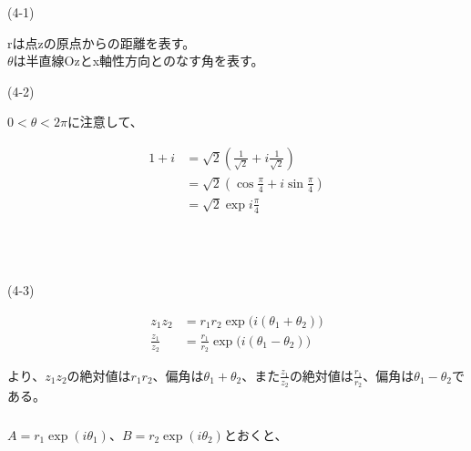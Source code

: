 \documentclass[dvipdfmx,a4paper]{jsarticle}
\begin{document}
\subsubsection{}

\begin{flushleft}
(4-1)
\end{flushleft}
rは点zの原点からの距離を表す。\\
$\theta$は半直線Ozとx軸性方向とのなす角を表す。\\


\begin{flushleft}
(4-2)
\end{flushleft}

$0 < \theta < 2\pi$に注意して、

\begin{align*}
1 + i &= \sqrt{2}(\frac{1}{\sqrt{2}} + i\frac{1}{\sqrt{2}})\\
&= \sqrt{2}(\cos{\frac{\pi}{4}}+ i\sin{\frac{\pi}{4}})\\
&= \sqrt{2}\exp{i\frac{\pi}{4}}
\end{align*}
\\
\\
\\

\begin{flushleft}
(4-3)
\end{flushleft}
 
 \begin{align*}
 z_1z_2 &= r_1r_2\exp{\bigl(i(\theta_1+\theta_2)\bigr)}\\
 \frac{z_1}{z_2} &= \frac{r_1}{r_2}\exp{\bigl(i(\theta_1-\theta_2)\bigr)}
 \end{align*}
 
 より、$z_1z_2$の絶対値は$r_1r_2$、偏角は$\theta_1+\theta_2$、また$\frac{z_1}{z_2}$の絶対値は$\frac{r_1}{r_2}$、偏角は$\theta_1-\theta_2$である。
 
 \subsubsection{}
 
 $A = r_1\exp{(i\theta_1)}$、$B = r_2\exp{(i\theta_2)}$とおくと、
 
\end{document}
